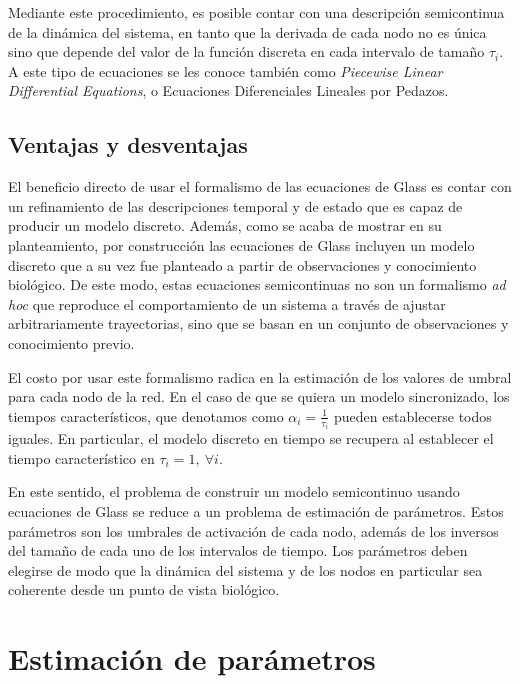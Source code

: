 Mediante este procedimiento, es posible contar con una descripción semicontinua de la dinámica del sistema, en tanto que la derivada de cada nodo no es única sino que depende del valor de la función discreta en cada intervalo de tamaño $\tau_i$. A este tipo de ecuaciones se les conoce también como \emph{Piecewise Linear Differential Equations}, o Ecuaciones Diferenciales Lineales por Pedazos.

\subsection{Ventajas y desventajas}

El beneficio directo de usar el formalismo de las ecuaciones de Glass es contar con un refinamiento de las descripciones temporal y de estado que es capaz de producir un modelo discreto. Además, como se acaba de mostrar en su planteamiento, por construcción las ecuaciones de Glass incluyen un modelo discreto que a su vez fue planteado a partir de observaciones y conocimiento biológico. De este modo, estas ecuaciones semicontinuas no son un formalismo \emph{ad hoc} que reproduce el comportamiento de un sistema a través de ajustar arbitrariamente trayectorias, sino que se basan en un conjunto de observaciones y conocimiento previo.

El costo por usar este formalismo radica en la estimación de los valores de umbral para cada nodo de la red. En el caso de que se quiera un modelo sincronizado, los tiempos característicos, que denotamos como $\alpha_i=\frac{1}{\tau_i}$ pueden establecerse todos iguales. En particular, el modelo discreto en tiempo se recupera al establecer el tiempo característico en $\tau_i = 1,\ \forall i$.

En este sentido, el problema de construir un modelo semicontinuo usando ecuaciones de Glass se reduce a un problema de estimación de parámetros. Estos parámetros son los umbrales de activación de cada nodo, además de los inversos del tamaño de cada uno de los intervalos de tiempo. Los parámetros deben elegirse de modo que la dinámica del sistema y de los nodos en particular sea coherente desde un punto de vista biológico.

\section{Estimación de parámetros}

